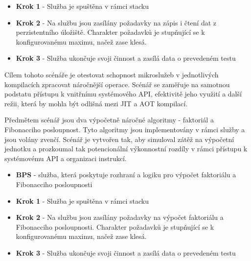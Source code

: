 
\begin{itemize}
    \item \textbf{Krok 1} - Služba je spuštěna v rámci stacku
    \item \textbf{Krok 2} - Na službu jsou zasílány požadavky na zápis i čtení dat z perzistentního úložiště. Charakter požadavků je stupňující se k konfigurovanému maximu, načež zase klesá.
    \item \textbf{Krok 3} - Služba ukončuje svoji činnost a zasílá data o prevedeném testu
\end{itemize}


Cílem tohoto scénáře je otestovat schopnost mikroslužeb v jednotlivých kompilacích zpracovat náročnější operace. Scénář se zaměřuje na samotnou podstatu přístupu k vnitřnímu systémového API, efektivitě jeho využití a další režii, která by mohla být odlišná mezi JIT a AOT kompilací.

Předmětem scénář jsou dva výpočetně náročné algoritmy - faktoriál a Fibonacciho posloupnost. Tyto algoritmy jsou implementovány v rámci služby a jsou volány zvenčí. Scénář je vytvořen tak, aby simuloval zátěž na výpočetní jednotku a prozkoumal tak potencionální výkonnostní rozdíly v rámci přístupu k systémovému API a organizaci instrukcí.



\begin{itemize}
    \item \textbf{BPS} - služba, která poskytuje rozhraní a logiku pro výpočet faktoriálu a Fibonacciho posloupnosti
\end{itemize}


\begin{itemize}
    \item \textbf{Krok 1} - Služba je spuštěna v rámci stacku
    \item \textbf{Krok 2} - Na službu jsou zasílány požadavky na výpočet faktoriálu a Fibonacciho posloupnosti. Charakter požadavků je stupňující se k konfigurovanému maximu, načež zase klesá.
    \item \textbf{Krok 3} - Služba ukončuje svoji činnost a zasílá data o prevedeném testu
    
\end{itemize}


